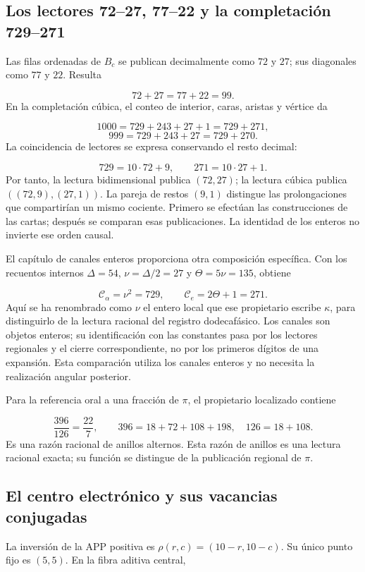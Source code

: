 \subsection{Los lectores 72–27, 77–22 y la completación 729–271}
Las filas ordenadas de \(B_c\) se publican decimalmente como \(72\) y \(27\); sus diagonales como \(77\) y \(22\). Resulta

\[
72+27=77+22=99.
\]
En la completación cúbica, el conteo de interior, caras, aristas y vértice da

\[
1000=729+243+27+1=729+271,
\]
\[
999=729+243+27=729+270.
\]
La coincidencia de lectores se expresa conservando el resto decimal:

\[
729=10\cdot72+9,\qquad271=10\cdot27+1.
\]
Por tanto, la lectura bidimensional publica \((72,27)\); la lectura cúbica publica \(((72,9),(27,1))\). La pareja de restos \((9,1)\) distingue las prolongaciones que compartirían un mismo cociente. Primero se efectúan las construcciones de las cartas; después se comparan esas publicaciones. La identidad de los enteros no invierte ese orden causal.

El capítulo de canales enteros proporciona otra composición específica. Con los recuentos internos \(\Delta=54\), \(\nu=\Delta/2=27\) y \(\Theta=5\nu=135\), obtiene

\[
\mathcal C_\alpha=\nu^2=729,
\qquad \mathcal C_e=2\Theta+1=271.
\]
Aquí se ha renombrado como \(\nu\) el entero local que ese propietario escribe \(\kappa\), para distinguirlo de la lectura racional del registro dodecafásico. Los canales son objetos enteros; su identificación con las constantes pasa por los lectores regionales y el cierre correspondiente, no por los primeros dígitos de una expansión. Esta comparación utiliza los canales enteros y no necesita la realización angular posterior.

Para la referencia oral a una fracción de \(\pi\), el propietario localizado contiene

\[
\frac{396}{126}=\frac{22}{7},\qquad
396=18+72+108+198,\quad126=18+108.
\]
Es una razón racional de anillos alternos. Esta razón de anillos es una lectura racional exacta; su función se distingue de la publicación regional de \(\pi\).

\subsection{El centro electrónico y sus vacancias conjugadas}
La inversión de la APP positiva es \(\rho(r,c)=(10-r,10-c)\). Su único punto fijo es \((5,5)\). En la fibra aditiva central,

